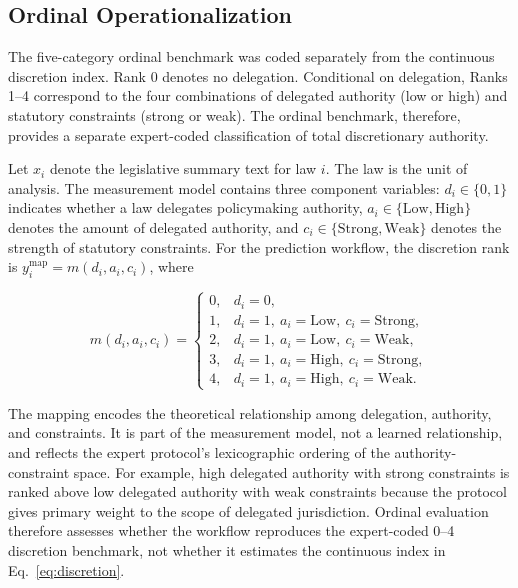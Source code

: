 \documentclass[runningheads]{llncs}
\begin{document}
\vspace{-0.2 cm}
\subsection{Ordinal Operationalization}
The five-category ordinal benchmark was coded separately from the continuous discretion index. Rank 0 denotes no delegation. Conditional on delegation, Ranks 1--4 correspond to the four combinations of delegated authority (low or high) and statutory constraints (strong or weak). The ordinal benchmark, therefore, provides a separate expert-coded classification of total discretionary authority.

Let $x_i$ denote the legislative summary text for law $i$. The law is the unit of analysis. The measurement model contains three component variables: $d_i \in \{0,1\}$ indicates whether a law delegates policymaking authority, $a_i \in \{\mathrm{Low},\mathrm{High}\}$ denotes the amount of delegated authority, and $c_i \in \{\mathrm{Strong},\mathrm{Weak}\}$ denotes the strength of statutory constraints. For the prediction workflow, the discretion rank is $y_i^{\mathrm{map}}=m(d_i,a_i,c_i)$, where

\begin{equation}
 m(d_i,a_i,c_i)=
\begin{cases}
0, & d_i=0,\\
1, & d_i=1,\ a_i=\mathrm{Low},\ c_i=\mathrm{Strong},\\
2, & d_i=1,\ a_i=\mathrm{Low},\ c_i=\mathrm{Weak},\\
3, & d_i=1,\ a_i=\mathrm{High},\ c_i=\mathrm{Strong},\\
4, & d_i=1,\ a_i=\mathrm{High},\ c_i=\mathrm{Weak}.
\end{cases}
\label{eq:rankmap}
\end{equation}

The mapping encodes the theoretical relationship among delegation, authority, and constraints. It is part of the measurement model, not a learned relationship, and reflects the expert protocol's lexicographic ordering of the authority-constraint space. For example, high delegated authority with strong constraints is ranked above low delegated authority with weak constraints because the protocol gives primary weight to the scope of delegated jurisdiction. Ordinal evaluation therefore assesses whether the workflow reproduces the expert-coded 0--4 discretion benchmark, not whether it estimates the continuous index in Eq.~\ref{eq:discretion}.
\end{document}
